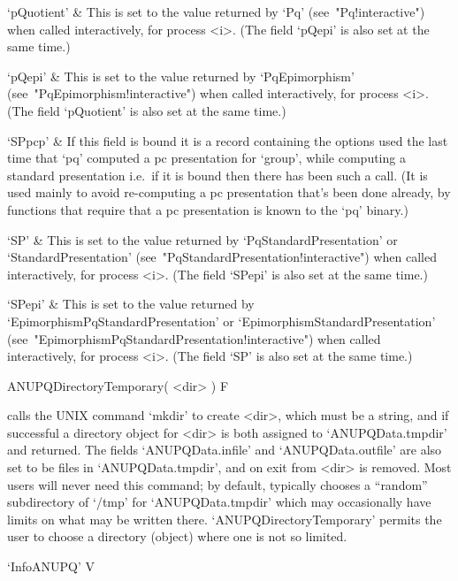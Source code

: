 \quad`pQuotient'  &  This  is  set  to  the  value   returned   by   `Pq'
(see~"Pq!interactive") when called interactively, for process  <i>.  (The
field `pQepi' is also set at the same time.)

\quad`pQepi' & This is set  to  the  value  returned  by  `PqEpimorphism'
(see~"PqEpimorphism!interactive") when called interactively, for  process
<i>. (The field `pQuotient' is also set at the same time.)

\quad`SPpcp' & If this field is bound  it  is  a  record  containing  the
options used the last time that  `pq'  computed  a  pc  presentation  for
`group', while computing a standard presentation i.e.~if it is bound then
there has been such a call. (It is used mainly to avoid re-computing a pc
presentation that's been done already, by functions that require  that  a
pc presentation is known to the `pq' binary.)

\quad`SP' & This is set to the value returned by `PqStandardPresentation'
or `StandardPresentation' (see~"PqStandardPresentation!interactive") when
called interactively, for process <i>. (The field `SPepi' is also set  at
the same time.)

\quad`SPepi'   &   This   is   set   to    the    value    returned    by
`EpimorphismPqStandardPresentation' or  `EpimorphismStandardPresentation'
(see~"EpimorphismPqStandardPresentation!interactive")     when     called
interactively, for process <i>. (The field `SP' is also set at  the  same
time.)

\enditems

\>ANUPQDirectoryTemporary( <dir> ) F

calls the UNIX command `mkdir' to create <dir>, which must be  a  string,
and if successful a directory  object  for  <dir>  is  both  assigned  to
`ANUPQData.tmpdir'  and  returned.  The  fields  `ANUPQData.infile'   and
`ANUPQData.outfile' are also set to be files in  `ANUPQData.tmpdir',  and
on exit from {\GAP} <dir> is removed. Most users  will  never  need  this
command; by default, {\GAP} typically chooses a  ``random''  subdirectory
of `/tmp' for `ANUPQData.tmpdir' which may occasionally  have  limits  on
what may be written there. `ANUPQDirectoryTemporary' permits the user  to
choose a directory (object) where one is not so limited.


\>`InfoANUPQ' V

